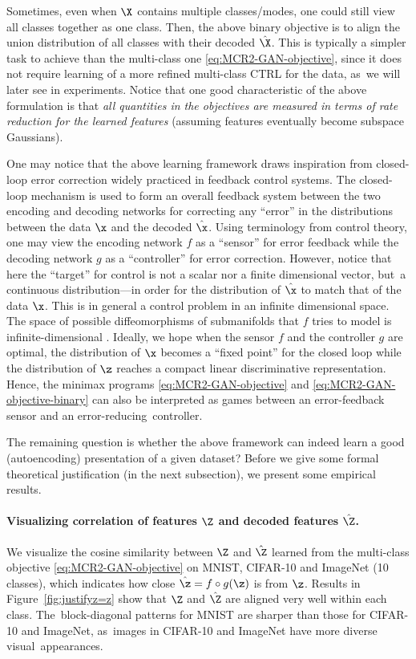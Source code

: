 \documentclass[../../book-main.tex]{subfiles}
\begin{document}
Sometimes, even when $\X$ contains multiple classes/modes, one could still view all classes together as one class. Then, the above binary objective is to align the union distribution of all classes with their decoded $\hat \X$. This is typically a simpler task to achieve than the multi-class one \eqref{eq:MCR2-GAN-objective}, since it does not require learning of a more refined multi-class CTRL for the data, as~we will later see in experiments. Notice that one good characteristic of the above formulation is that {\em all quantities in the objectives are measured in terms of rate reduction for the learned features} (assuming features eventually become subspace Gaussians). 

One may notice that the above learning framework draws inspiration from closed-loop error correction widely practiced in feedback control systems. The closed-loop mechanism is used to form an overall feedback system between the two encoding and decoding networks for correcting any  ``error'' in the distributions between the data $\x$ and the decoded $\hat \x$. Using terminology from control theory, one may view the encoding network $f$ as a ``sensor'' for error feedback while the decoding network $g$ as a ``controller'' for error correction. However, notice that here the ``target'' for control is not a scalar nor a finite dimensional vector, but~a continuous distribution---in order for the distribution of $\hat \x$ to match that of the data $\x$. This is in general a control problem in an infinite dimensional space. The space of possible diffeomorphisms of submanifolds that $f$ tries to model is infinite-dimensional \cite{Lee2002IntroductionTS}. Ideally, we hope when the sensor $f$ and the controller $g$ are optimal, the distribution of $\x$ becomes a ``fixed point'' for the closed loop while the distribution of $\z$ reaches a compact linear discriminative representation. Hence, the minimax programs \eqref{eq:MCR2-GAN-objective} and \eqref{eq:MCR2-GAN-objective-binary} can also be interpreted as games between an error-feedback sensor and an error-reducing~controller.

The remaining question is whether the above framework can indeed learn a good (autoencoding) presentation of a given dataset? Before we give some formal theoretical justification (in the next subsection), we present some empirical results. 

\paragraph{Visualizing correlation of features $\Z$ and decoded features $\hat \Z$.} We visualize the cosine similarity between $\Z$ and $\hat{\Z}$ learned from the multi-class objective \eqref{eq:MCR2-GAN-objective} on MNIST, CIFAR-10 and ImageNet (10 classes), which indicates how close $\hat{\z} = f\circ g(\z)$ is from $\z$. Results in Figure~\ref{fig:justifyz=z} show that $\Z$ and $\hat{\Z}$ are aligned very well within each class. The~block-diagonal patterns for MNIST are sharper than those for CIFAR-10 and ImageNet, as~images in CIFAR-10 and ImageNet have more diverse visual~appearances.
\end{document}
